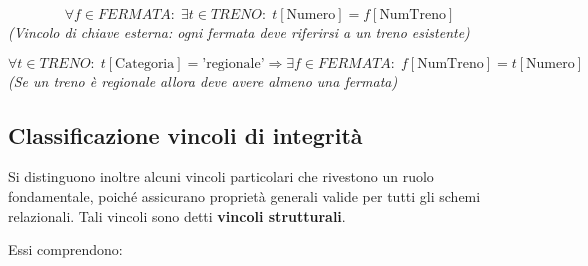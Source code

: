 \[
\forall f \in FERMATA :\; \exists t \in TRENO :\; t[\text{Numero}] = f[\text{NumTreno}]
\]
\textit{(Vincolo di chiave esterna: ogni fermata deve riferirsi a un treno esistente)}

\[
\forall t \in TRENO :\; t[\text{Categoria}] = \text{'regionale'}
\Rightarrow \exists f \in FERMATA :\; f[\text{NumTreno}] = t[\text{Numero}]
\]
\textit{(Se un treno è regionale allora deve avere almeno una fermata)}
\subsection{Classificazione vincoli di integrità}
Si distinguono inoltre alcuni vincoli particolari che rivestono un ruolo 
fondamentale, poiché assicurano proprietà generali valide per tutti gli 
schemi relazionali. Tali vincoli sono detti \textbf{vincoli strutturali}.

Essi comprendono:

